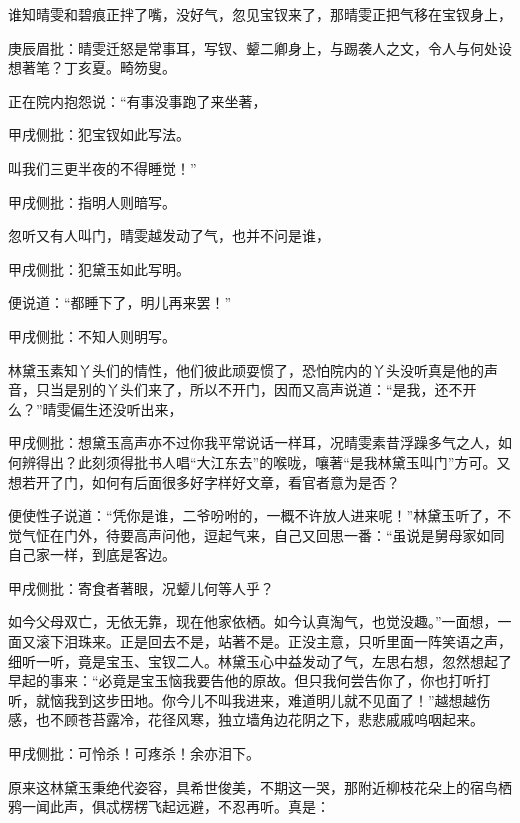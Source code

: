 \begin{parag}
    谁知晴雯和碧痕正拌了嘴，没好气，忽见宝钗来了，那晴雯正把气移在宝钗身上，\begin{note}庚辰眉批：晴雯迁怒是常事耳，写钗、颦二卿身上，与踢袭人之文，令人与何处设想著笔？丁亥夏。畸笏叟。\end{note}正在院内抱怨说：“有事没事跑了来坐著，\begin{note}甲戌侧批：犯宝钗如此写法。\end{note}叫我们三更半夜的不得睡觉！”\begin{note}甲戌侧批：指明人则暗写。\end{note}忽听又有人叫门，晴雯越发动了气，也并不问是谁，\begin{note}甲戌侧批：犯黛玉如此写明。\end{note}便说道：“都睡下了，明儿再来罢！”\begin{note}甲戌侧批：不知人则明写。\end{note}林黛玉素知丫头们的情性，他们彼此顽耍惯了，恐怕院内的丫头没听真是他的声音，只当是别的丫头们来了，所以不开门，因而又高声说道：“是我，还不开么？”晴雯偏生还没听出来，\begin{note}甲戌侧批：想黛玉高声亦不过你我平常说话一样耳，况晴雯素昔浮躁多气之人，如何辨得出？此刻须得批书人唱“大江东去”的喉咙，嚷著“是我林黛玉叫门”方可。又想若开了门，如何有后面很多好字样好文章，看官者意为是否？\end{note}便使性子说道：“凭你是谁，二爷吩咐的，一概不许放人进来呢！”林黛玉听了，不觉气怔在门外，待要高声问他，逗起气来，自己又回思一番：“虽说是舅母家如同自己家一样，到底是客边。\begin{note}甲戌侧批：寄食者著眼，况颦儿何等人乎？\end{note}如今父母双亡，无依无靠，现在他家依栖。如今认真淘气，也觉没趣。”一面想，一面又滚下泪珠来。正是回去不是，站著不是。正没主意，只听里面一阵笑语之声，细听一听，竟是宝玉、宝钗二人。林黛玉心中益发动了气，左思右想，忽然想起了早起的事来：“必竟是宝玉恼我要告他的原故。但只我何尝告你了，你也打听打听，就恼我到这步田地。你今儿不叫我进来，难道明儿就不见面了！”越想越伤感，也不顾苍苔露冷，花径风寒，独立墙角边花阴之下，悲悲戚戚呜咽起来。\begin{note}甲戌侧批：可怜杀！可疼杀！余亦泪下。\end{note}
\end{parag}


\begin{parag}
    原来这林黛玉秉绝代姿容，具希世俊美，不期这一哭，那附近柳枝花朵上的宿鸟栖鸦一闻此声，俱忒楞楞飞起远避，不忍再听。真是：
\end{parag}


